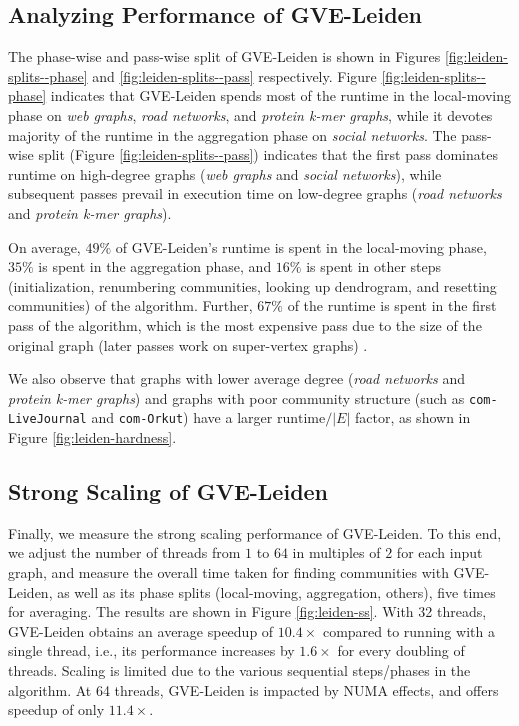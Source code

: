 






\subsection{Analyzing Performance of GVE-Leiden}

The phase-wise and pass-wise split of GVE-Leiden is shown in Figures \ref{fig:leiden-splits--phase} and \ref{fig:leiden-splits--pass} respectively. Figure \ref{fig:leiden-splits--phase} indicates that GVE-Leiden spends most of the runtime in the local-moving phase on \textit{web graphs}, \textit{road networks}, and \textit{protein k-mer graphs}, while it devotes majority of the runtime in the aggregation phase on \textit{social networks}. The pass-wise split (Figure \ref{fig:leiden-splits--pass}) indicates that the first pass dominates runtime on high-degree graphs (\textit{web graphs} and \textit{social networks}), while subsequent passes prevail in execution time on low-degree graphs (\textit{road networks} and \textit{protein k-mer graphs}).

On average, $49\%$ of GVE-Leiden's runtime is spent in the local-moving phase, $35\%$ is spent in the aggregation phase, and $16\%$ is spent in other steps (initialization, renumbering communities, looking up dendrogram, and resetting communities) of the algorithm. Further, $67\%$ of the runtime is spent in the first pass of the algorithm, which is the most expensive pass due to the size of the original graph (later passes work on super-vertex graphs) \cite{com-wickramaarachchi14}.

We also observe that graphs with lower average degree (\textit{road networks} and \textit{protein k-mer graphs}) and graphs with poor community structure (such as \verb|com-LiveJournal| and \verb|com-Orkut|) have a larger $\text{runtime}/|E|$ factor, as shown in Figure \ref{fig:leiden-hardness}.





\subsection{Strong Scaling of GVE-Leiden}

Finally, we measure the strong scaling performance of GVE-Leiden. To this end, we adjust the number of threads from $1$ to $64$ in multiples of $2$ for each input graph, and measure the overall time taken for finding communities with GVE-Leiden, as well as its phase splits (local-moving, aggregation, others), five times for averaging. The results are shown in Figure \ref{fig:leiden-ss}. With 32 threads, GVE-Leiden obtains an average speedup of $10.4\times$ compared to running with a single thread, i.e., its performance increases by $1.6\times$ for every doubling of threads. Scaling is limited due to the various sequential steps/phases in the algorithm. At 64 threads, GVE-Leiden is impacted by NUMA effects, and offers speedup of only $11.4\times$.
